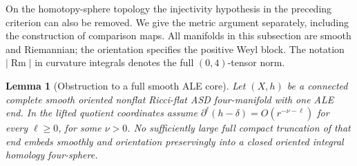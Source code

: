 \documentclass[11pt]{article}
\numberwithin{equation}{section}
\newtheorem{lemma}[theorem]{Lemma}
\theoremstyle{definition}
\theoremstyle{remark}
\begin{document}
On the homotopy-sphere topology the injectivity hypothesis in the
preceding criterion can also be removed. We give the metric argument
separately, including the construction of comparison maps. All
manifolds in this subsection are smooth and Riemannian; the orientation
specifies the positive Weyl block. The notation \(|\operatorname{Rm}|\)
in curvature integrals denotes the full \((0,4)\)-tensor norm.

\begin{lemma}[Obstruction to a full smooth ALE core]
\label{lem:ale-core-obstruction}
Let \((X,h)\) be a connected complete smooth oriented nonflat
Ricci-flat ASD four-manifold with one ALE end. In the lifted
quotient coordinates assume
\(\partial^\ell(h-\delta)=O(r^{-\nu-\ell})\) for every
\(\ell\ge0\), for some \(\nu>0\).
No sufficiently large full compact truncation of that end embeds
smoothly and orientation preservingly into a closed oriented
integral homology four-sphere.
\end{lemma}
\end{document}
